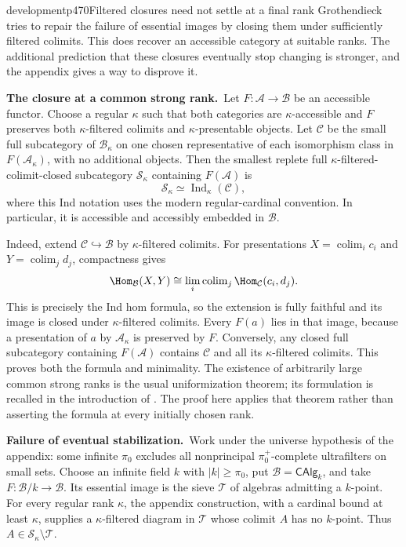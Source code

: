 \begin{dcomment}{development}{p470}{Filtered closures need not settle at a final rank}
Grothendieck tries to repair the failure of essential images by closing them under sufficiently filtered colimits. This does recover an accessible category at suitable ranks. The additional prediction that these closures eventually stop changing is stronger, and the appendix gives a way to disprove it.

\textbf{The closure at a common strong rank.}\ours\
Let $F:\mathcal A\to\mathcal B$ be an accessible functor. Choose a regular $\kappa$ such that both categories are $\kappa$-accessible and $F$ preserves both $\kappa$-filtered colimits and $\kappa$-presentable objects. Let $\mathcal C$ be the small full subcategory of $\mathcal B_\kappa$ on one chosen representative of each isomorphism class in $F(\mathcal A_\kappa)$, with no additional objects. Then the smallest replete full $\kappa$-filtered-colimit-closed subcategory $\mathcal S_\kappa$ containing $F(\mathcal A)$ is
\[
 \mathcal S_\kappa\simeq\operatorname{Ind}_\kappa(\mathcal C),
\]
where this Ind notation uses the modern regular-cardinal convention. In particular, it is accessible and accessibly embedded in $\mathcal B$.

Indeed, extend $\mathcal C\hookrightarrow\mathcal B$ by $\kappa$-filtered colimits. For presentations $X=\operatorname{colim}_i c_i$ and $Y=\operatorname{colim}_j d_j$, compactness gives
\[
 \Hom_{\mathcal B}(X,Y)
 \cong\lim_i\operatorname{colim}_j\Hom_{\mathcal C}(c_i,d_j).
\]
This is precisely the Ind hom formula, so the extension is fully faithful and its image is closed under $\kappa$-filtered colimits. Every $F(a)$ lies in that image, because a presentation of $a$ by $\mathcal A_\kappa$ is preserved by $F$. Conversely, any closed full subcategory containing $F(\mathcal A)$ contains $\mathcal C$ and all its $\kappa$-filtered colimits. This proves both the formula and minimality. The existence of arbitrarily large common strong ranks is the usual uniformization theorem; its formulation is recalled in the introduction of \citet{PareRosicky2013}. The proof here applies that theorem rather than asserting the formula at every initially chosen rank.

\textbf{Failure of eventual stabilization.}\ours\
Work under the universe hypothesis of the appendix: some infinite $\pi_0$ excludes all nonprincipal $\pi_0^+$-complete ultrafilters on small sets. Choose an infinite field $k$ with $|k|\ge\pi_0$, put $\mathcal B=\mathsf{CAlg}_k$, and take $F:\mathcal B/k\to\mathcal B$. Its essential image is the sieve $\mathcal T$ of algebras admitting a $k$-point. For every regular rank $\kappa$, the appendix construction, with a cardinal bound at least $\kappa$, supplies a $\kappa$-filtered diagram in $\mathcal T$ whose colimit $A$ has no $k$-point. Thus $A\in\mathcal S_\kappa\setminus\mathcal T$.


\end{dcomment}
